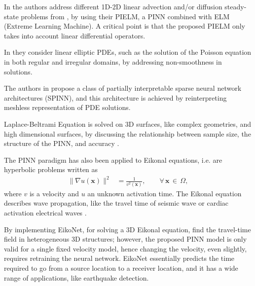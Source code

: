 \documentclass[pdflatex,sn-basic]{sn-jnl}%
\theoremstyle{thmstyleone}%
\theoremstyle{thmstyletwo}%
\theoremstyle{thmstylethree}%
\begin{document}
In \cite{Dwi2020_PhysicsInformedExtreme_SriDS} the authors address different 1D-2D linear advection and/or diffusion steady-state problems from \cite{Ber2018_UnifiedDeepArtificial_NysBN}, by using their PIELM, a PINN combined with ELM (Extreme Learning Machine). A critical point is that the proposed PIELM only takes into account linear differential operators.

In  \cite{Ram2021_SpinnSparsePhysics_RamRR} they consider linear elliptic PDEs, such as the solution of the Poisson equation in both regular and irregular domains, by addressing non-smoothness in solutions.

The authors in \cite{Ram2021_SpinnSparsePhysics_RamRR} propose a class of partially interpretable sparse neural network architectures (SPINN), and this architecture is achieved by reinterpreting meshless representation of PDE solutions.

Laplace-Beltrami Equation is solved on 3D surfaces, like complex geometries, and high dimensional surfaces, by discussing the relationship between sample size, the structure of the PINN, and accuracy \citep{Fan2020_PhysicsInformedNeural_ZhaFZ}.

The PINN paradigm has also been applied to Eikonal equations, i.e.  are hyperbolic problems written as
\begin{equation*}
\begin{aligned}
    \| \nabla u (\bm{x})\|^2 & = \frac{1}{v^2(\bm{x})}, \qquad \forall \, \bm{x}\, \in \, \Omega,%
\label{eq:eikonal}
\end{aligned}
\end{equation*}
where $v$ is a velocity and $u$ an unknown activation time. %
The Eikonal equation describes wave propagation, like the travel time of seismic wave \citep{Wah2021_PinneikEikonalSolution_HagWHA, Smi2021_EikonetSolvingEikonal_AziSAR} or cardiac activation electrical waves \citep{Sah2020_PhysicsInformedNeural_YanSCYP, Gra2021_LearningAtrialFiber_PezGPC}.

By implementing  EikoNet, for solving a 3D Eikonal equation, \cite{Smi2021_EikonetSolvingEikonal_AziSAR}  find the travel-time field in heterogeneous 3D structures; however, the proposed PINN model is only valid for a single fixed velocity model, hence changing the velocity, even slightly, requires retraining the neural network. EikoNet essentially predicts the time required to go from a source location to a receiver location, and it has a wide range of applications, like earthquake detection. 
\end{document}
